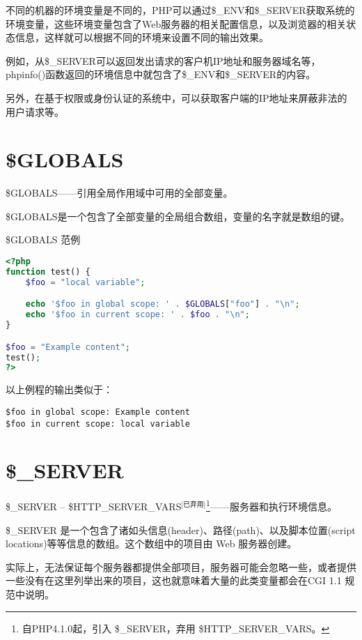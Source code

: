 不同的机器的环境变量是不同的，PHP可以通过\$\_ENV和\$\_SERVER获取系统的环境变量，这些环境变量包含了Web服务器的相关配置信息，以及浏览器的相关状态信息，这样就可以根据不同的环境来设置不同的输出效果。

例如，从\$\_SERVER可以返回发出请求的客户机IP地址和服务器域名等，phpinfo()函数返回的环境信息中就包含了\$\_ENV和\$\_SERVER的内容。


另外，在基于权限或身份认证的系统中，可以获取客户端的IP地址来屏蔽非法的用户请求等。




\section{\$GLOBALS}

\$GLOBALS——引用全局作用域中可用的全部变量。

\$GLOBALS是一个包含了全部变量的全局组合数组，变量的名字就是数组的键。


\begin{example}
\$GLOBALS 范例
\begin{lstlisting}[language=PHP]
<?php
function test() {
    $foo = "local variable";

    echo '$foo in global scope: ' . $GLOBALS["foo"] . "\n";
    echo '$foo in current scope: ' . $foo . "\n";
}

$foo = "Example content";
test();
?>
\end{lstlisting}
\end{example}

以上例程的输出类似于：

\begin{verbatim}
$foo in global scope: Example content
$foo in current scope: local variable
\end{verbatim}


\section{\$\_SERVER}


\$\_SERVER -- \$HTTP\_SERVER\_VARS$^{\text{[已弃用]}}$\footnote{自PHP4.1.0起，引入 \$\_SERVER，弃用 \$HTTP\_SERVER\_VARS。}——服务器和执行环境信息。

\$\_SERVER 是一个包含了诸如头信息(header)、路径(path)、以及脚本位置(script locations)等等信息的数组。这个数组中的项目由 Web 服务器创建。

实际上，无法保证每个服务器都提供全部项目，服务器可能会忽略一些，或者提供一些没有在这里列举出来的项目，这也就意味着大量的此类变量都会在CGI 1.1 规范中说明。


